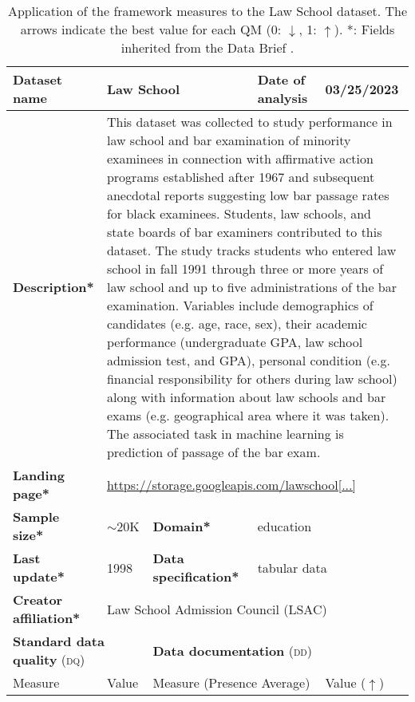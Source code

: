 \begin{table}[h]
    \caption{Application of the framework measures to the Law School dataset. The arrows indicate the best value for each QM (0: $\downarrow$, 1: $\uparrow$). *: Fields inherited from the Data Brief \cite{fabrisAlgorithmicFairnessDatasets2022}.}
    \label{tab:LawSchool}
    \begin{tabular}{|p{3cm}|p{1.9cm}p{3cm}p{2.6cm}p{1.6cm}|}
        \hline
        \textbf{Dataset name} & \multicolumn{2}{l|}{Law School} & \multicolumn{1}{l|}{\textbf{Date of analysis}} & 03/25/2023 \\ \hline
        \textbf{Description*} & \multicolumn{4}{p{10cm}|}{This dataset was collected to study performance in law school and bar examination of minority examinees in connection with affirmative action programs established after 1967 and subsequent anecdotal reports suggesting low bar passage rates for black examinees. Students, law schools, and state boards of bar examiners contributed to this dataset. The study tracks students who entered law school in fall 1991 through three or more years of law school and up to five administrations of the bar examination. Variables include demographics of candidates (e.g. age, race, sex), their academic performance (undergraduate GPA, law school admission test, and GPA), personal condition (e.g. financial responsibility for others during law school) along with information about law schools and bar exams (e.g. geographical area where it was taken). The associated task in machine learning is prediction of passage of the bar exam.} \\ \hline
        \textbf{Landing page*} & \multicolumn{4}{l|}{\href{https://storage.googleapis.com/lawschool_dataset/bar_pass_prediction.csv}{https://storage.googleapis.com/lawschool[...]}} \\ \hline
        \textbf{Sample size*} & $\sim$20K & \multicolumn{1}{|l}{\textbf{Domain*}} & \multicolumn{2}{|l|}{education}  \\ \hline
        \textbf{Last update*} & 1998 & \multicolumn{1}{|p{3cm}}{\textbf{Data specification*}} & \multicolumn{2}{|l|}{tabular data} \\ \hline
        \textbf{Creator affiliation*} & \multicolumn{4}{l|}{Law School Admission Council (LSAC)} \\ \hline\hline
        \multicolumn{2}{|l|}{\textbf{Standard data quality} (\textsc{dq})} & \multicolumn{3}{|l|}{\textbf{Data documentation} (\textsc{dd})}\\ \hline
        Measure & Value & \multicolumn{2}{|l|}{Measure (Presence Average)} & Value ($\uparrow$) \\ \hline

\end{tabular}
\end{table}
